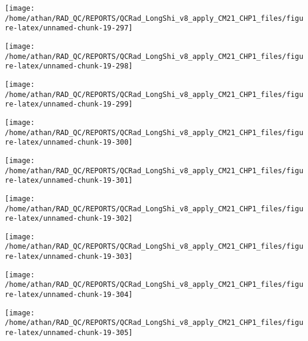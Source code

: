 \documentclass[
  10pt,
  a4paper,oneside]{article}
\begin{document}
\begin{center}\texttt{[image: /home/athan/RAD\_QC/REPORTS/QCRad\_LongShi\_v8\_apply\_CM21\_CHP1\_files/figure-latex/unnamed-chunk-19-297]} \end{center}

\begin{center}\texttt{[image: /home/athan/RAD\_QC/REPORTS/QCRad\_LongShi\_v8\_apply\_CM21\_CHP1\_files/figure-latex/unnamed-chunk-19-298]} \end{center}

\begin{center}\texttt{[image: /home/athan/RAD\_QC/REPORTS/QCRad\_LongShi\_v8\_apply\_CM21\_CHP1\_files/figure-latex/unnamed-chunk-19-299]} \end{center}

\begin{center}\texttt{[image: /home/athan/RAD\_QC/REPORTS/QCRad\_LongShi\_v8\_apply\_CM21\_CHP1\_files/figure-latex/unnamed-chunk-19-300]} \end{center}

\begin{center}\texttt{[image: /home/athan/RAD\_QC/REPORTS/QCRad\_LongShi\_v8\_apply\_CM21\_CHP1\_files/figure-latex/unnamed-chunk-19-301]} \end{center}

\begin{center}\texttt{[image: /home/athan/RAD\_QC/REPORTS/QCRad\_LongShi\_v8\_apply\_CM21\_CHP1\_files/figure-latex/unnamed-chunk-19-302]} \end{center}

\begin{center}\texttt{[image: /home/athan/RAD\_QC/REPORTS/QCRad\_LongShi\_v8\_apply\_CM21\_CHP1\_files/figure-latex/unnamed-chunk-19-303]} \end{center}

\begin{center}\texttt{[image: /home/athan/RAD\_QC/REPORTS/QCRad\_LongShi\_v8\_apply\_CM21\_CHP1\_files/figure-latex/unnamed-chunk-19-304]} \end{center}

\begin{center}\texttt{[image: /home/athan/RAD\_QC/REPORTS/QCRad\_LongShi\_v8\_apply\_CM21\_CHP1\_files/figure-latex/unnamed-chunk-19-305]} \end{center}
\end{document}
